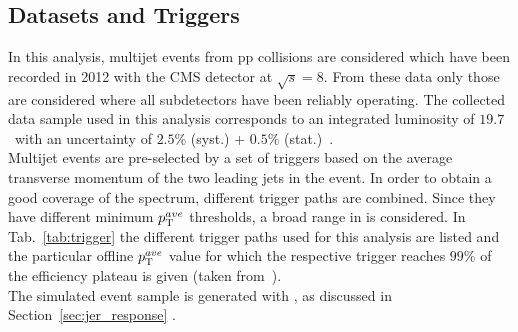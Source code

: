\subsection{Datasets and Triggers}
\label{subsec:jer_samples_and_trigger}
\begin{table}[!tp]
\centering
\caption{Trigger paths with offline \ptave thresholds at which the trigger efficiency reaches the $99\%$ efficiency plateau. Thresholds are given for PFCHS jets.}
\label{tab:trigger}
\end{table}  
In this analysis, multijet events from pp collisions are considered which have been recorded in 2012 with the CMS detector at $\sqrt{s}=8$\tev. From these data only those are considered where all subdetectors have been reliably operating. The collected data sample used in this analysis corresponds to an integrated luminosity of $19.7$~\fbinv with an uncertainty of $2.5\%$ (syst.) + $0.5\%$ (stat.)~\cite{CMS-PAS-LUM-13-001}. \\
Multijet events are pre-selected by a set of triggers based on the average transverse momentum of the two leading jets in the event. In order to obtain a good coverage of the \ptave spectrum, different trigger paths are combined. Since they have different minimum $p_{\text{T}}^{ave}$ thresholds, a broad range in \ptave is considered. In Tab.~\ref{tab:trigger} the different trigger paths used for this analysis are listed and the particular offline $p_{\text{T}}^{ave}$ value for which the respective trigger reaches $99\%$ of the efficiency plateau is given (taken from~\cite{website:HamburgCalib}). \\
The simulated event sample is generated with \pythia, as discussed in Section~\ref{sec:jer_response} .  

